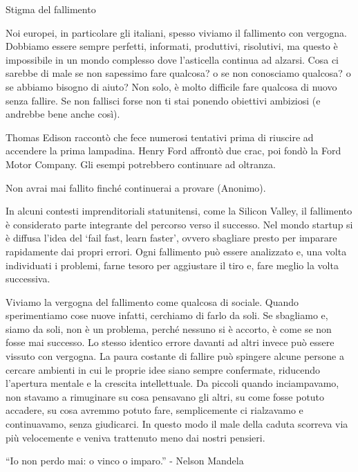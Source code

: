 \documentclass[12pt]{book} %
\begin{document}
\begin{mdframed}[linewidth=1pt]
Stigma del fallimento

Noi europei, in particolare gli italiani, spesso viviamo il fallimento con vergogna. Dobbiamo essere sempre
perfetti, informati, produttivi, risolutivi, ma questo è impossibile in un mondo complesso dove
l'asticella continua ad alzarsi. Cosa ci sarebbe di male se non sapessimo fare qualcosa? o se non
conosciamo qualcosa? o se abbiamo bisogno di aiuto? Non solo, è molto difficile fare qualcosa di nuovo senza fallire. Se non fallisci forse non ti stai ponendo obiettivi ambiziosi (e andrebbe bene anche così).

Thomas Edison raccontò che fece numerosi tentativi prima di riuscire ad accendere la prima lampadina. Henry Ford affrontò due crac, poi fondò la Ford Motor Company. Gli esempi potrebbero continuare ad oltranza.

Non avrai mai fallito finché continuerai a provare (Anonimo).

In alcuni contesti imprenditoriali statunitensi, come la Silicon Valley, il fallimento è considerato parte integrante del percorso verso il successo. Nel mondo startup si è diffusa l’idea del ‘fail fast, learn faster’, ovvero sbagliare presto per imparare rapidamente dai propri errori. Ogni
fallimento può essere analizzato e, una volta individuati i problemi, farne tesoro per aggiustare il tiro e, fare
meglio la volta successiva. 

Viviamo la vergogna del fallimento come qualcosa di sociale. Quando sperimentiamo cose nuove infatti, cerchiamo di farlo da soli. Se sbagliamo e, siamo da soli, non è un
problema, perché nessuno si è accorto, è come se non fosse mai successo. Lo stesso identico errore davanti ad altri
invece può essere vissuto con vergogna. La paura costante di fallire può spingere alcune persone a cercare ambienti in cui le proprie idee siano sempre confermate, riducendo l’apertura mentale e la crescita intellettuale. Da piccoli quando inciampavamo,
non stavamo a rimuginare su cosa pensavano gli altri, su come fosse potuto accadere, su cosa avremmo potuto fare,
semplicemente ci rialzavamo e continuavamo, senza giudicarci. In questo modo il male della caduta scorreva via più velocemente e veniva trattenuto meno dai nostri pensieri. 

“Io non perdo mai: o vinco o imparo.” - Nelson Mandela 
\end{mdframed}
\end{document}
